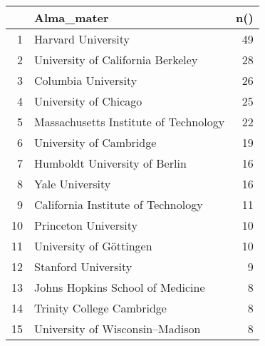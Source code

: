 \begin{table}[ht]
\centering
\begin{tabular}{rlr}
  \hline
 & Alma\_mater & n() \\ 
  \hline
1 & Harvard University &  49 \\ 
  2 & University of California Berkeley &  28 \\ 
  3 & Columbia University &  26 \\ 
  4 & University of Chicago &  25 \\ 
  5 & Massachusetts Institute of Technology &  22 \\ 
  6 & University of Cambridge &  19 \\ 
  7 & Humboldt University of Berlin &  16 \\ 
  8 & Yale University &  16 \\ 
  9 & California Institute of Technology &  11 \\ 
  10 & Princeton University &  10 \\ 
  11 & University of Göttingen &  10 \\ 
  12 & Stanford University &   9 \\ 
  13 & Johns Hopkins School of Medicine &   8 \\ 
  14 & Trinity College Cambridge &   8 \\ 
  15 & University of Wisconsin–Madison &   8 \\ 
   \hline
\end{tabular}
\end{table}
